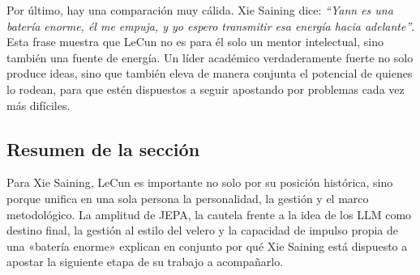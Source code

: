 Por último, hay una comparación muy cálida. Xie Saining dice: \textit{``Yann es una batería enorme, él me empuja, y yo espero transmitir esa energía hacia adelante''}. Esta frase muestra que LeCun no es para él solo un mentor intelectual, sino también una fuente de energía. Un líder académico verdaderamente fuerte no solo produce ideas, sino que también eleva de manera conjunta el potencial de quienes lo rodean, para que estén dispuestos a seguir apostando por problemas cada vez más difíciles.

\subsection{Resumen de la sección}

Para Xie Saining, LeCun es importante no solo por su posición histórica, sino porque unifica en una sola persona la personalidad, la gestión y el marco metodológico. La amplitud de JEPA, la cautela frente a la idea de los LLM como destino final, la gestión al estilo del velero y la capacidad de impulso propia de una «batería enorme» explican en conjunto por qué Xie Saining está dispuesto a apostar la siguiente etapa de su trabajo a acompañarlo.

